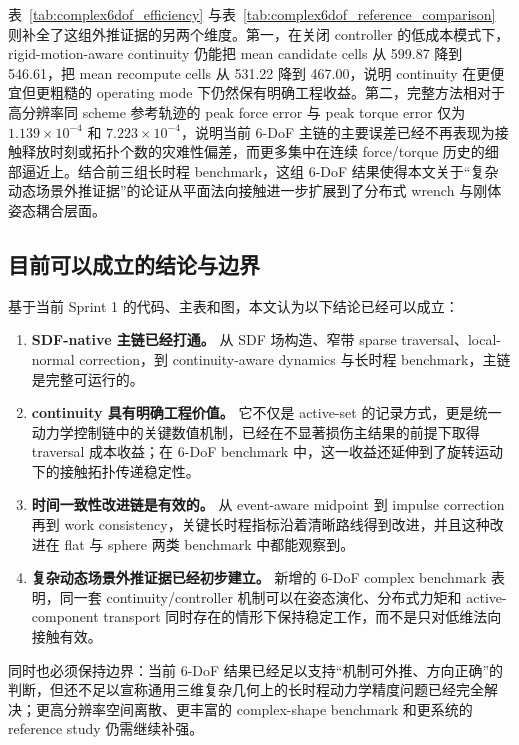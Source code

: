 \documentclass[11pt,a4paper]{ctexart}
\begin{document}



表~\ref{tab:complex6dof_efficiency} 与表~\ref{tab:complex6dof_reference_comparison} 则补全了这组外推证据的另两个维度。第一，在关闭 controller 的低成本模式下，rigid-motion-aware continuity 仍能把 mean candidate cells 从 599.87 降到 546.61，把 mean recompute cells 从 531.22 降到 467.00，说明 continuity 在更便宜但更粗糙的 operating mode 下仍然保有明确工程收益。第二，完整方法相对于高分辨率同 scheme 参考轨迹的 peak force error 与 peak torque error 仅为 $1.139\times 10^{-4}$ 和 $7.223\times 10^{-4}$，说明当前 6-DoF 主链的主要误差已经不再表现为接触释放时刻或拓扑个数的灾难性偏差，而更多集中在连续 force/torque 历史的细部逼近上。结合前三组长时程 benchmark，这组 6-DoF 结果使得本文关于“复杂动态场景外推证据”的论证从平面法向接触进一步扩展到了分布式 wrench 与刚体姿态耦合层面。

\subsection{目前可以成立的结论与边界}
基于当前 Sprint 1 的代码、主表和图，本文认为以下结论已经可以成立：
\begin{enumerate}
    \item \textbf{SDF-native 主链已经打通。} 从 SDF 场构造、窄带 sparse traversal、local-normal correction，到 continuity-aware dynamics 与长时程 benchmark，主链是完整可运行的。
    \item \textbf{continuity 具有明确工程价值。} 它不仅是 active-set 的记录方式，更是统一动力学控制链中的关键数值机制，已经在不显著损伤主结果的前提下取得 traversal 成本收益；在 6-DoF benchmark 中，这一收益还延伸到了旋转运动下的接触拓扑传递稳定性。
    \item \textbf{时间一致性改进链是有效的。} 从 event-aware midpoint 到 impulse correction 再到 work consistency，关键长时程指标沿着清晰路线得到改进，并且这种改进在 flat 与 sphere 两类 benchmark 中都能观察到。
    \item \textbf{复杂动态场景外推证据已经初步建立。} 新增的 6-DoF complex benchmark 表明，同一套 continuity/controller 机制可以在姿态演化、分布式力矩和 active-component transport 同时存在的情形下保持稳定工作，而不是只对低维法向接触有效。
\end{enumerate}
同时也必须保持边界：当前 6-DoF 结果已经足以支持“机制可外推、方向正确”的判断，但还不足以宣称通用三维复杂几何上的长时程动力学精度问题已经完全解决；更高分辨率空间离散、更丰富的 complex-shape benchmark 和更系统的 reference study 仍需继续补强。
\end{document}
